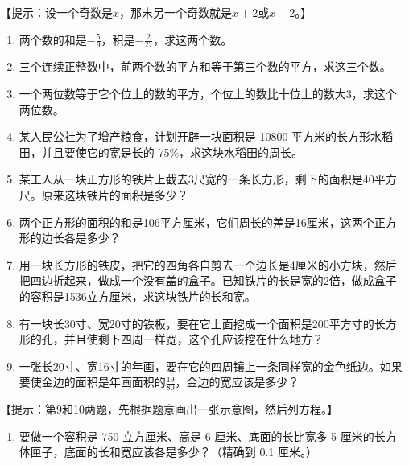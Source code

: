 【提示：设一个奇数是\(x\)，那末另一个奇数就是\(x + 2\)或\(x - 2\)。】

\begin{enumerate}[start=2]
\item
  两个数的和是\(-\frac{5}{9}\)，积是\(-\frac{2}{27}\)，求这两个数。
\item
  三个连续正整数中，前两个数的平方和等于第三个数的平方，求这三个数。
\item
  一个两位数等于它个位上的数的平方，个位上的数比十位上的数大3，求这个两位数。
\item
  某人民公社为了增产粮食，计划开辟一块面积是 10800
  平方米的长方形水稻田，并且要使它的宽是长的 75\%，求这块水稻田的周长。
\item
  某工人从一块正方形的铁片上截去3尺宽的一条长方形，剩下的面积是40平方尺。原来这块铁片的面积是多少？
\item
  两个正方形的面积的和是106平方厘米，它们周长的差是16厘米，这两个正方形的边长各是多少？
\item
  用一块长方形的铁皮，把它的四角各自剪去一个边长是4厘米的小方块，然后把四边折起来，做成一个没有盖的盒子。已知铁片的长是宽的2倍，做成盒子的容积是1536立方厘米，求这块铁片的长和宽。
\item
  有一块长30寸、宽20寸的铁板，要在它上面挖成一个面积是200平方寸的长方形的孔，并且使剩下四周一样宽，这个孔应该挖在什么地方？
\item
  一张长20寸、宽16寸的年画，要在它的四周镶上一条同样宽的金色纸边。如果要使金边的面积是年画面积的\(\frac{19}{80}\)，金边的宽应该是多少？
\end{enumerate}

【提示：第9和10两题，先根据题意画出一张示意图，然后列方程。】

\begin{enumerate}[start=11]
\item
  要做一个容积是 750 立方厘米、高是 6 厘米、底面的长比宽多 5
  厘米的长方体匣子，底面的长和宽应该各是多少？（精确到 0.1 厘米。）
\end{enumerate}

